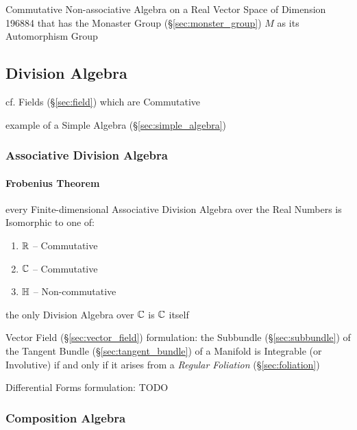 Commutative Non-associative Algebra on a Real Vector Space of Dimension 196884
that has the Monaster Group (\S\ref{sec:monster_group}) $M$ as its Automorphism
Group



\subsection{Division Algebra}\label{sec:division_algebra}

cf. Fields (\S\ref{sec:field}) which are Commutative

example of a Simple Algebra (\S\ref{sec:simple_algebra})



\subsubsection{Associative Division Algebra}
\label{sec:associative_division_algebra}

\paragraph{Frobenius Theorem}\label{sec:frobenius_theorem}\hfill

every Finite-dimensional Associative Division Algebra over the Real Numbers is
Isomorphic to one of:
\begin{enumerate}
  \item $\mathbb{R}$ -- Commutative
  \item $\mathbb{C}$ -- Commutative
  \item $\mathbb{H}$ -- Non-commutative
\end{enumerate}

the only Division Algebra over $\mathbb{C}$ is $\mathbb{C}$ itself

Vector Field (\S\ref{sec:vector_field}) formulation: the Subbundle
(\S\ref{sec:subbundle}) of the Tangent Bundle (\S\ref{sec:tangent_bundle}) of a
Manifold is Integrable (or Involutive) if and only if it arises from a
\emph{Regular Foliation} (\S\ref{sec:foliation})

Differential Forms formulation: TODO



\subsubsection{Composition Algebra}\label{sec:composition_algebra}

